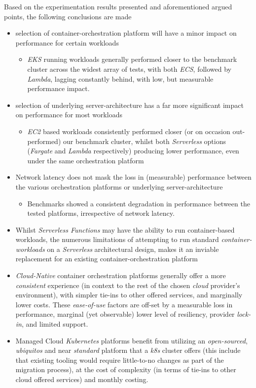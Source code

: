 Based on the experimentation results presented and aforementioned argued points, the following conclusions are made
\begin{itemize}
  \item selection of container-orchestration platform will have a minor impact on performance for certain workloads
        \begin{itemize}
          \item \textit{EKS} running workloads generally performed closer to the benchmark cluster across the widest array of tests,
                with both \textit{ECS}, followed by \textit{Lambda}, lagging constantly behind, with low, but measurable performance impact.
        \end{itemize}
  \item selection of underlying server-architecture has a far more significant impact on performance for most workloads
        \begin{itemize}
          \item \textit{EC2} based workloads consistently performed closer (or on occasion out-performed) our benchmark cluster,
                whilst both \textit{Serverless} options (\textit{Fargate} and \textit{Lambda} respectively) producing lower performance,
                even under the same orchestration platform
        \end{itemize}
  \item Network latency does not mask the loss in (measurable) performance between the various orchestration platforms or underlying server-architecture
        \begin{itemize}
          \item Benchmarks showed a consistent degradation in performance between the tested platforms, irrespective of network latency.
        \end{itemize}
  \item Whilst \textit{Serverless Functions} may have the ability to run container-based workloads,
        the numerous limitations of attempting to run standard \textit{container-workloads} on a
        \textit{Serverless} architectural design, makes it an inviable replacement for an existing container-orchestration platform
  \item \textit{Cloud-Native} container orchestration platforms generally offer a more \emph{consistent} experience
        (in context to the rest of the chosen \textit{cloud} provider's environment), with simpler tie-ins to other offered services, and marginally lower costs.
        These \emph{ease-of-use} factors are off-set by a measurable loss in performance, marginal (yet observable) lower level of resiliency, provider \textit{lock-in},
        and limited support.
  \item Managed Cloud \textit{Kubernetes} platforms benefit from utilizing an \textit{open-sourced}, \emph{ubiquitos} and near \textit{standard} platform
        that a \textit{k8s} cluster offers (this include that existing tooling would require little-to-no changes as part of the migration process),
        at the cost of complexity (in terms of tie-ins to other cloud offered services) and monthly costing.
\end{itemize}

